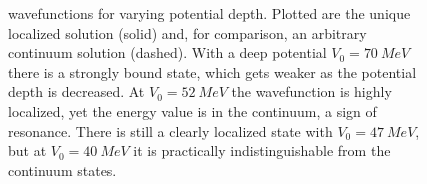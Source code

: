 \documentclass[../main/report.tex]{subfiles}
\begin{document}

\begin{figure}
  \caption{
     wavefunctions for varying potential depth. 
    Plotted are the unique localized solution (solid) and, for comparison, an arbitrary continuum solution (dashed).
    With a deep potential $V_0 = \SI{70}{MeV}$ there is a strongly bound state, which gets weaker as the potential depth is decreased.
    At $V_0 = \SI{52}{MeV}$ the wavefunction is highly localized, yet the energy value is in the continuum, a sign of resonance.
    There is still a clearly localized state with $V_0 = \SI{47}{MeV}$, but at $V_0 = \SI{40}{MeV}$ it is practically indistinguishable from the continuum states.
  } 
  \label{fig:wavefunctions}
  \end{figure}


\end{document}
